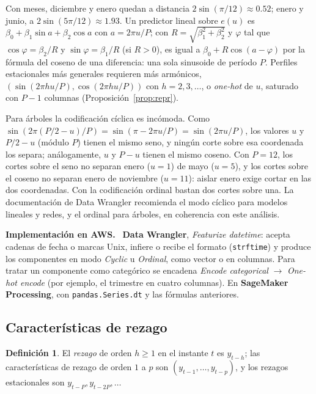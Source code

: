 \documentclass[11pt,a4paper]{article}
\theoremstyle{plain}
\theoremstyle{definition}
\newtheorem{definicion}[teorema]{Definición}
\theoremstyle{remark}
\newcommand{\1}{\mathbf{1}}
\newenvironment{aws}{\par\medskip\sloppy\noindent\textbf{Implementación en AWS.}\ }{\par\medskip}
\begin{document}
Con meses, diciembre y enero quedan a distancia $2\sin(\pi/12)\approx0.52$;
enero y junio, a $2\sin(5\pi/12)\approx1.93$. Un predictor lineal sobre
$e(u)$ es $\beta_0+\beta_1\sin a+\beta_2\cos a$ con $a=2\pi u/P$; con
$R=\sqrt{\beta_1^2+\beta_2^2}$ y $\varphi$ tal que $\cos\varphi=\beta_2/R$ y
$\sin\varphi=\beta_1/R$ (si $R>0$), es igual a $\beta_0+R\cos(a-\varphi)$
por la fórmula del coseno de una diferencia: una sola sinusoide de período
$P$. Perfiles estacionales más generales requieren más armónicos,
$(\sin(2\pi hu/P),\cos(2\pi hu/P))$ con $h=2,3,\dots$, o \emph{one-hot} de
$u$, saturado con $P-1$ columnas (Proposición~\ref{prop:repr}).

Para árboles la codificación cíclica es incómoda. Como
$\sin(2\pi(P/2-u)/P)=\sin(\pi-2\pi u/P)=\sin(2\pi u/P)$, los valores $u$ y
$P/2-u$ (módulo $P$) tienen el mismo seno, y ningún corte sobre esa
coordenada los separa; análogamente, $u$ y $P-u$ tienen el mismo coseno.
Con $P=12$, los cortes sobre el seno no separan enero ($u=1$) de mayo
($u=5$), y los cortes sobre el coseno no separan enero de noviembre
($u=11$): aislar enero exige cortar en las dos coordenadas. Con la
codificación ordinal bastan dos cortes sobre una. La documentación de
Data Wrangler recomienda el modo cíclico para modelos lineales y redes, y
el ordinal para árboles, en coherencia con este análisis.

\begin{aws}
\textbf{Data Wrangler}, \emph{Featurize datetime}: acepta cadenas de fecha
o marcas Unix, infiere o recibe el formato (\texttt{strftime}) y produce
los componentes en modo \emph{Cyclic} u \emph{Ordinal}, como vector o en
columnas. Para tratar un componente como categórico se encadena
\emph{Encode categorical} $\to$ \emph{One-hot encode} (por ejemplo, el
trimestre en cuatro columnas). En \textbf{SageMaker Processing}, con
\texttt{pandas.Series.dt} y las fórmulas anteriores.
\end{aws}

\subsection{Características de rezago}

\begin{definicion}
El \emph{rezago} de orden $h\ge1$ en el instante $t$ es $y_{t-h}$; las
características de rezago de orden $1$ a $p$ son
$(y_{t-1},\dots,y_{t-p})$, y los rezagos estacionales son
$y_{t-P},y_{t-2P},\dots$
\end{definicion}
\end{document}
